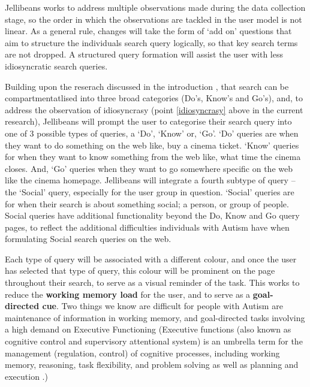 \documentclass[a4paper, 11pt]{article}
\begin{document}
\vspace{5mm} %
Jellibeans works to address multiple observations made during the data collection stage, so the order in which the observations are tackled in the user model is not linear. As a general rule, changes will take the form of `add on' questions that aim to structure the individuals search query logically, so that key search terms are not dropped. A structured query formation will assist the user with less idiosyncratic search queries. \\


\vspace{5mm} %

Building upon the reserach discussed in the introduction \cite{seo}, that search can be compartmentatlised into three broad categories (Do's, Know's and Go's), and, to address the observation of idiosyncrasy (point \ref{idiosyncrasy} above in the current research), Jellibeans will prompt the user to categorise their search query into one of 3 possible types of queries, a `Do', `Know' or, `Go'. `Do' queries are when they want to do something on the web like, buy a cinema ticket. `Know' queries for when they want to know something from the web like, what time the cinema closes. And, `Go' queries when they want to go somewhere specific on the web like the cinema homepage. Jellibeans will integrate a fourth subtype of query -- the `Social' query, especially for the user group in question. `Social' queries are for when their search is about something social; a person, or group of people. Social queries have additional functionality beyond the Do, Know and Go query pages, to reflect the additional difficulties individuals with Autism have when formulating Social search queries on the web.

\vspace{5mm}
Each type of query will be associated with a different colour, and once the user has selected that type of query, this colour will be prominent on the page throughout their search, to serve as a visual reminder of the task. This works to reduce the \textbf{working memory load} for the user, and to serve as a \textbf{goal-directed cue}. Two things we know are difficult for people with Autism are maintenance of information in working memory, and goal-directed tasks involving a high demand on Executive Functioning (Executive functions (also known as cognitive control and supervisory attentional system) is an umbrella term for the management (regulation, control) of cognitive processes, including working memory, reasoning, task flexibility, and problem solving as well as planning and execution \cite{EF}.) 
\end{document}
